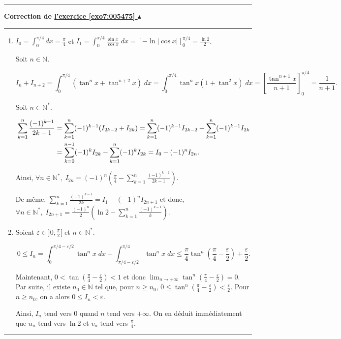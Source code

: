 \documentclass[11pt,a4paper]{article}
\newcommand{\Nn}{\mathbb{N}} \newcommand{\N}{\mathbb{N}}
\newcommand{\nocorrection}{}
\newcounter{exo}
\newcommand{\correction}[1]{\hypertarget{cor7:#1}{}\label{cor7:#1}{\bf Correction de \hyperlink{exo7:#1}{l'exercice \ref{exo7:#1} $\blacktriangle$}}\vspace{1mm}\hrule\vspace{1mm}}
\newcommand{\fincorrection}{\vspace{1mm}\hrule\vspace*{7mm}}
\begin{document}
\fincorrection
\nocorrection
\correction{005475}
\begin{enumerate} 
\item  $I_0=\int_{0}^{\pi/4}dx=\frac{\pi}{4}$ et $I_{1}=\int_{0}^{\pi/4}\frac{\sin x}{\cos x}\;dx=\left[-\ln|\cos x|\right]_{0}^{\pi/4}=\frac{\ln2}{2}$.

Soit $n\in\Nn$.

$$I_n+I_{n+2}=\int_{0}^{\pi/4}(\tan^nx+\tan^{n+2}x)\;dx=\int_{0}^{\pi/4}\tan^nx(1+\tan^2x)\;dx=\left[\frac{\tan^{n+1}x}{n+1}\right]_{0}^{\pi/4}=\frac{1}{n+1}.$$

Soit $n\in\Nn^*$.

\begin{align*}\ensuremath
\sum_{k=1}^{n}\frac{(-1)^{k-1}}{2k-1}&=\sum_{k=1}^{n}(-1)^{k-1}(I_{2k-2}+I_{2k})=\sum_{k=1}^{n}(-1)^{k-1}I_{2k-2}
+\sum_{k=1}^{n}(-1)^{k-1}I_{2k}\\
 &=\sum_{k=0}^{n-1}(-1)^{k}I_{2k}-\sum_{k=1}^{n}(-1)^{k}I_{2k}=I_0-(-1)^nI_{2n}.
\end{align*}

Ainsi, $\forall n\in\Nn^*,\;I_{2n}=(-1)^n\left(\frac{\pi}{4}-\sum_{k=1}^{n}\frac{(-1)^{k-1}}{2k-1}\right)$.

De même, $\sum_{k=1}^{n}\frac{(-1)^{k-1}}{2k}=I_1-(-1)^nI_{2n+1}$ et donc, $\forall n\in\Nn^*,\;I_{2n+1}=\frac{(-1)^n}{2}\left(\ln2-\sum_{k=1}^{n}\frac{(-1)^{k-1}}{k}\right)$.

\item  Soient $\varepsilon\in]0,\frac{\pi}{2}[$ et $n\in\Nn^*$.

$$0\leq I_n=\int_{0}^{\pi/4-\varepsilon/2}\tan^nx\;dx+\int_{\pi/4-\varepsilon/2}^{\pi/4}\tan^nx\;dx\leq\frac{\pi}{4}\tan^n(\frac{\pi}{4}-\frac{\varepsilon}{2})+\frac{\varepsilon}{2}.$$

Maintenant, $0<\tan(\frac{\pi}{4}-\frac{\varepsilon}{2})<1$ et donc $\lim_{n\rightarrow +\infty}\tan^n(\frac{\pi}{4}-\frac{\varepsilon}{2})=0$. Par suite, il existe $n_0\in\Nn$ tel que, pour $n\geq n_0$, $0\leq\tan^n(\frac{\pi}{4}-\frac{\varepsilon}{2})<\frac{\varepsilon}{2}$. Pour $n\geq n_0$, on a alors $0\leq I_n<\varepsilon$.

Ainsi, $I_n$ tend vers $0$ quand $n$ tend vers $+\infty$. On en déduit immédiatement que $u_n$ tend vers $\ln2$ et $v_n$ tend vers $\frac{\pi}{4}$.

\end{enumerate}
\fincorrection
\end{document}
